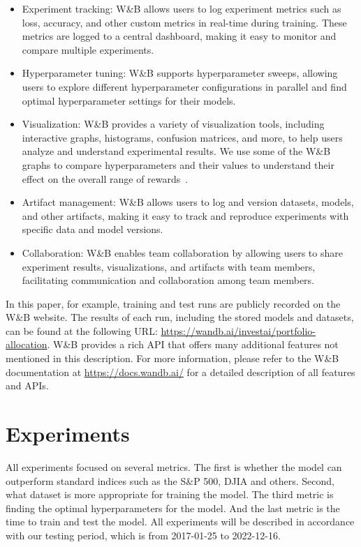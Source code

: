 \documentclass[../xlapes02]{subfiles}
\begin{document}
    \begin{itemize}
        \item Experiment tracking: W\&B allows users to log experiment metrics such as loss, accuracy, and other custom metrics in real-time during training. These metrics are logged to a central dashboard, making it easy to monitor and compare multiple experiments.
        \item Hyperparameter tuning: W\&B supports hyperparameter sweeps, allowing users to explore different hyperparameter configurations in parallel and find optimal hyperparameter settings for their models.
        \item Visualization: W\&B provides a variety of visualization tools, including interactive graphs, histograms, confusion matrices, and more, to help users analyze and understand experimental results. We use some of the W\&B graphs to compare hyperparameters and their values to understand their effect on the overall range of rewards~.
        \item Artifact management: W\&B allows users to log and version datasets, models, and other artifacts, making it easy to track and reproduce experiments with specific data and model versions.
        \item Collaboration: W\&B enables team collaboration by allowing users to share experiment results, visualizations, and artifacts with team members, facilitating communication and collaboration among team members.
    \end{itemize}

    In this paper, for example, training and test runs are publicly recorded on the W\&B website. The results of each run, including the stored models and datasets, can be found at the following URL: \url{https://wandb.ai/investai/portfolio-allocation}. W\&B provides a rich API that offers many additional features not mentioned in this description. For more information, please refer to the W\&B documentation at \url{https://docs.wandb.ai/} for a detailed description of all features and APIs.


    \section{Experiments}\label{sec:experiments}
    All experiments focused on several metrics. The first is whether the model can outperform standard indices such as the S\&P 500, DJIA and others. Second, what dataset is more appropriate for training the model. The third metric is finding the optimal hyperparameters for the model. And the last metric is the time to train and test the model. All experiments will be described in accordance with our testing period, which is from 2017-01-25 to 2022-12-16.
\end{document}
